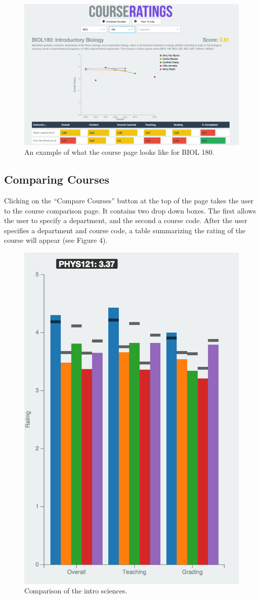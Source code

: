 \documentclass{chi2009}
\begin{document}
\begin{figure}[t]
\begin{center}
\includegraphics[width=\columnwidth]{figs/coursePage.png}
\vspace*{-0.25in}
\caption{An example of what the course page looks like for BIOL 180.}
\label{fig:coursePage}
\end{center}
\end{figure}

\subsection{Comparing Courses}
Clicking on the ``Compare Courses'' button at the top of the page takes the user to the course comparison page. It contains two drop down boxes. The first allows the user to specify a department, and the second a course code. After the user specifies a department and course code, a table summarizing the rating of the course will appear (see Figure 4).

\begin{figure}[t]
\begin{center}
\includegraphics[width=0.55\columnwidth]{figs/barChart.png}
\vspace*{-0.1in}
\caption{Comparison of the intro sciences.}
\label{fig:coursePage}
\end{center}
\end{figure}
\end{document}
